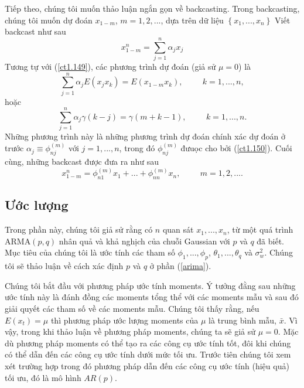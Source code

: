 \documentclass[12pt, a4paper,oneside]{book}
\theoremstyle{definition}
\begin{document}
Tiếp theo, chúng tôi muốn thảo luận ngắn gọn về backcasting. Trong backcasting, chúng tôi muốn dự đoán $ x_{1-m} $, $ m=1, 2, ...$, dựa trên dữ liệu $ \left\lbrace x_{1},...,x_{n} \right\rbrace $ 
Viết backcast như sau
\begin{equation}
x_{1-m}^n=\sum_{j=1}^{n}\alpha_{j}x_{j} \label{ct1.172}
\end{equation}
Tương tự với (\ref{ct1.149}), các phương trình dự đoán (giả sử $ \mu = 0 $) là 
\begin{equation}
\sum_{j=1}^{n}\alpha_{j}E(x_{j}x_{k})=E(x_{1-m}x_{k}), \hspace{1cm} k=1,...,n, \label{ct1.173}
\end{equation}
hoặc 
\begin{equation}
\sum_{j=1}^{n}\alpha_{j}\gamma(k-j)=\gamma(m+k-1), \hspace{1cm} k=1,...,n. \label{ct1.174}
\end{equation}
Những phương trình này là những phương trình dự đoán chính xác dự đoán ở trước $ \alpha_{j}\equiv \phi_{nj}^{(m)} $ với $ j=1,...,n$, trong đó $ \phi_{nj}^{(m)} $ đưuọc cho bởi (\ref{ct1.150}). Cuối cùng, những backcast được đưa ra như sau
\begin{equation}
x_{1-m}^n= \phi_{n1}^{(m)}x_{1}+...+\phi_{nn}^{(m)}x_{n}, \hspace{1cm} m=1,2,... .\label{ct1.175}
\end{equation}
\subsection{Ước lượng}
Trong phần này, chúng tôi giả sử rằng có $n$ quan sát $x_{1} ,..., x_{n}$, từ một quá trình ARMA$(p,q)$ nhân quả và khả nghịch của chuỗi Gaussian với $p$ và $q$ đã biết. Mục tiêu của chúng tôi là ước tính các tham số $ \phi_{1} ,..., \phi_{p}$, $\theta_{1} ,..., \theta_{q} $ và $\sigma_{w}^2 $. Chúng tôi sẽ thảo luận về cách xác định $p$ và $q$ ở phần (\ref{arima}).

Chúng tôi bắt đầu với phương pháp ước tính moments. Ý tưởng đằng sau những ước tính này là đánh đồng các moments tổng thể  với các moments mẫu và sau đó giải quyết các tham số về các moments mẫu. Chúng tôi thấy rằng, nếu $ E(x_{t})=\mu $ thì phương pháp ước lượng moments của $ \mu $ là trung bình mẫu, $ \bar{x} $. Vì vậy, trong khi thảo luận về phương pháp moments, chúng ta sẽ giả sử $ \mu=0 $. Mặc dù phương pháp moments có thể tạo ra các công cụ ước tính tốt, đôi khi chúng có thể dẫn đến các công cụ ước tính dưới mức tối ưu. Trước tiên chúng tôi xem xét trường hợp trong đó phương pháp dẫn đến các công cụ ước tính (hiệu quả) tối ưu, đó là mô hình $ AR(p) $.
\end{document}
